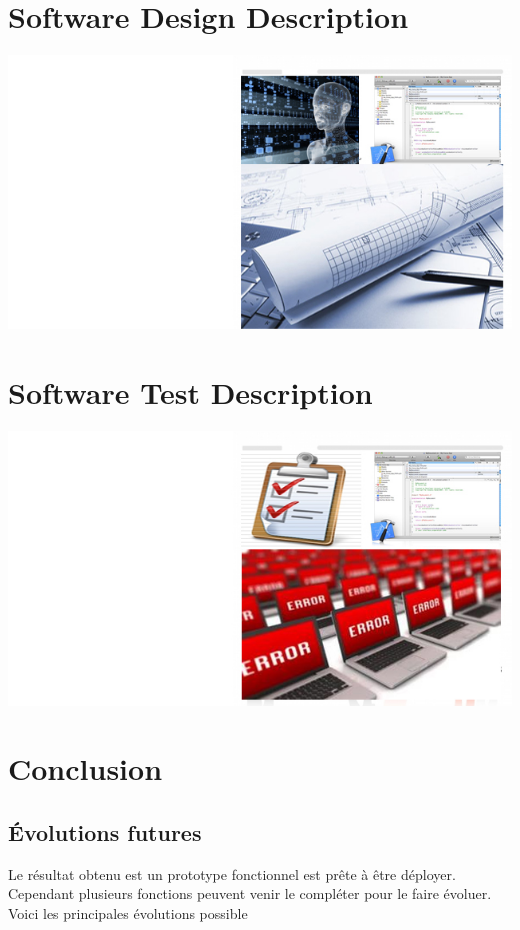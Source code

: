 \documentclass[12pt,a4paper,twoside]{report}
\begin{document}
\chapter{Software Design Description\label{sdd}}
\vspace{6cm}
\includegraphics[width=1\textwidth]{../comon/figures/sddPic.jpg}
\cleardoublepage


\cleardoublepage
\chapter{Software Test Description\label{std}}
\vspace{6cm}
\includegraphics[width=1\textwidth]{../comon/figures/stdPic.jpg}
\cleardoublepage


\cleardoublepage
\chapter{Conclusion}
\cleardoublepage
\section{Évolutions futures}
Le résultat obtenu est un prototype fonctionnel est prête à être déployer. Cependant plusieurs fonctions peuvent venir le compléter pour le faire évoluer.
Voici les principales évolutions possible 
\end{document}
